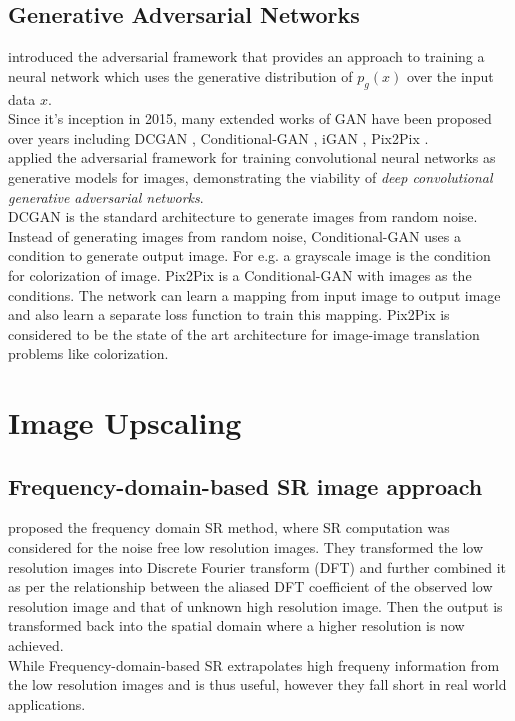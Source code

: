 \documentclass[oneside,a4paper,12pt]{report}
\begin{document}
\subsection{Generative Adversarial Networks}
\hspace*{0.25 in}\cite{goodfellow2014generative} introduced the adversarial framework that provides an approach to training a neural network which uses the generative distribution of $p_g(x)$ over the input data $x$.\\
		\hspace*{0.25 in}Since it's inception in 2015, many extended works of GAN have been proposed over years including DCGAN \citep{radford2016unsupervised}, Conditional-GAN \citep{mirza2014conditional}, iGAN \citep{zhu2018generative}, Pix2Pix \citep{isola2018imagetoimage}.\\
		\hspace*{0.25 in}\cite{radford2016unsupervised} applied the adversarial framework for training convolutional neural networks as generative models for images, demonstrating the viability of \textit{deep convolutional generative adversarial networks}.\\
		\hspace*{0.25 in}DCGAN is the standard architecture to generate images from random noise. Instead of generating images from random noise, Conditional-GAN \citep{mirza2014conditional} uses a condition to generate output image. For e.g. a grayscale image is the condition for colorization of image. Pix2Pix \citep{isola2018imagetoimage} is a Conditional-GAN with images as the conditions. The network can learn a mapping from input image to output image and also learn a separate loss function to train this mapping. Pix2Pix is considered to be the state of the art architecture for image-image translation problems like colorization.
\section{Image Upscaling}
\subsection{Frequency-domain-based SR image approach}
\hspace*{0.25 in} \cite{tsai1984multiframe} proposed the frequency domain SR method, where SR computation was considered for the noise free low resolution images. They transformed the low resolution images into Discrete Fourier transform (DFT) and further combined it as per the relationship between the aliased DFT coefficient of the observed low resolution image and that of unknown high resolution image. Then the output is transformed back into the spatial domain where a higher resolution is now achieved.\\
        \hspace*{0.25 in} While Frequency-domain-based SR extrapolates high frequeny information from the low resolution images and is thus useful, however they fall short in real world applications.
\end{document}
